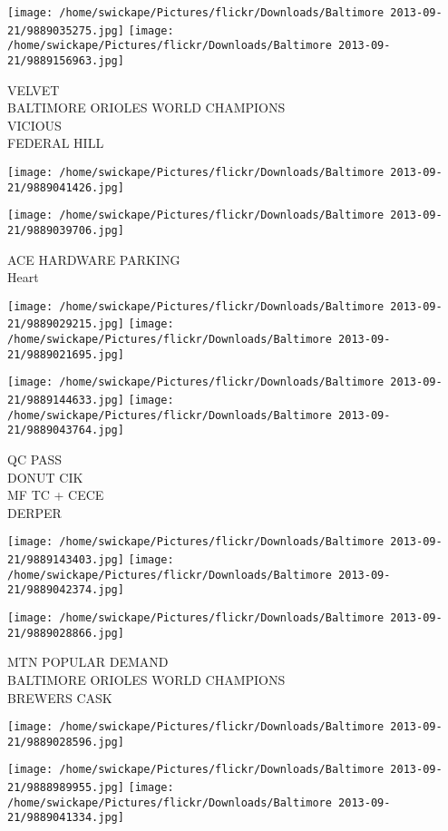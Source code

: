 \documentclass[10pt,letterpaper]{article}
\begin{document}
\texttt{[image: /home/swickape/Pictures/flickr/Downloads/Baltimore 2013-09-21/9889035275.jpg]}
\texttt{[image: /home/swickape/Pictures/flickr/Downloads/Baltimore 2013-09-21/9889156963.jpg]}

VELVET\\
BALTIMORE ORIOLES WORLD CHAMPIONS\\
VICIOUS\\
FEDERAL HILL
\pagebreak

\texttt{[image: /home/swickape/Pictures/flickr/Downloads/Baltimore 2013-09-21/9889041426.jpg]}

\vspace{0.25in}
\texttt{[image: /home/swickape/Pictures/flickr/Downloads/Baltimore 2013-09-21/9889039706.jpg]}

ACE HARDWARE PARKING\\
Heart
\pagebreak

\texttt{[image: /home/swickape/Pictures/flickr/Downloads/Baltimore 2013-09-21/9889029215.jpg]}
\texttt{[image: /home/swickape/Pictures/flickr/Downloads/Baltimore 2013-09-21/9889021695.jpg]}

\texttt{[image: /home/swickape/Pictures/flickr/Downloads/Baltimore 2013-09-21/9889144633.jpg]}
\texttt{[image: /home/swickape/Pictures/flickr/Downloads/Baltimore 2013-09-21/9889043764.jpg]}

QC PASS\\
DONUT CIK\\
MF TC + CECE\\
DERPER
\pagebreak

\texttt{[image: /home/swickape/Pictures/flickr/Downloads/Baltimore 2013-09-21/9889143403.jpg]}
\texttt{[image: /home/swickape/Pictures/flickr/Downloads/Baltimore 2013-09-21/9889042374.jpg]}

\texttt{[image: /home/swickape/Pictures/flickr/Downloads/Baltimore 2013-09-21/9889028866.jpg]}

MTN POPULAR DEMAND\\
BALTIMORE ORIOLES WORLD CHAMPIONS\\
BREWERS CASK
\pagebreak

\texttt{[image: /home/swickape/Pictures/flickr/Downloads/Baltimore 2013-09-21/9889028596.jpg]}

\vspace{0.25in}
\texttt{[image: /home/swickape/Pictures/flickr/Downloads/Baltimore 2013-09-21/9888989955.jpg]}
\texttt{[image: /home/swickape/Pictures/flickr/Downloads/Baltimore 2013-09-21/9889041334.jpg]}
\end{document}
